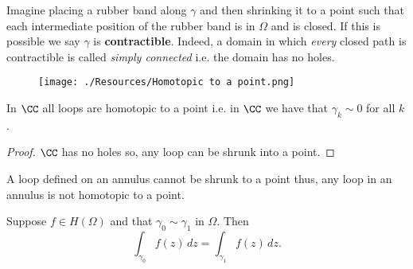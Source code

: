 \documentclass[12pt, a4paper]{article}
\begin{document}
\begin{mdnote}
    Imagine placing a rubber band along \(\gamma\) and then shrinking it to a point such that each intermediate position of the rubber band is in \(\Omega\) and is closed. If this is possible we say \(\gamma\) is \textbf{contractible}. Indeed, a domain in which \textit{every} closed path is contractible is called \textit{simply connected} i.e. the domain has no holes.
\end{mdnote}

\begin{example}
    \hphantom{yes}
    \begin{figure}[H]
         \begin{center}
             \texttt{[image: ./Resources/Homotopic to a point.png]}
         \end{center}
    \end{figure}
\end{example}

\begin{mdthm}
    In \(\CC\) all loops are homotopic to a point i.e. in \(\CC\) we have that \(\gamma_k \sim 0\) for all \(k\).
\end{mdthm}

\begin{proof}
    \(\CC\) has no holes so, any loop can be shrunk into a point.
\end{proof}

\begin{mdexample}
    A loop defined on an annulus cannot be shrunk to a point thus, any loop in an annulus is not homotopic to a point.
\end{mdexample}

\begin{mdthm}
    Suppose \(f \in H(\Omega)\) and that \(\gamma_0 \sim \gamma_1\) in \(\Omega\). Then 
    \[\int_{\gamma_0} f(z) \, dz = \int_{\gamma_1} f(z) \, dz.\]
\end{mdthm}
\end{document}
